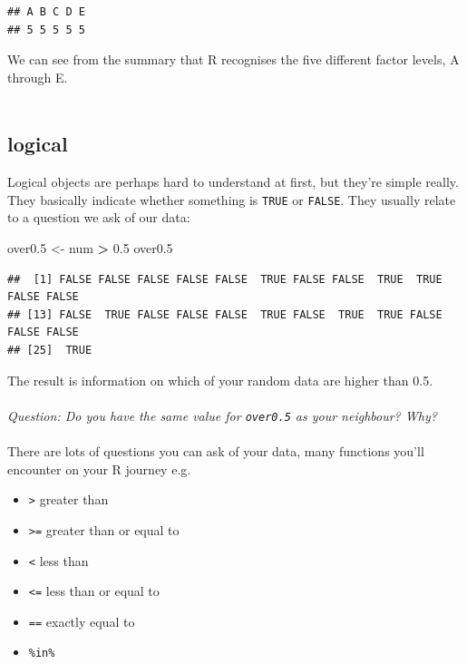 \documentclass[
]{book}
\newenvironment{Shaded}{\begin{snugshade}}{\end{snugshade}}
\newcommand{\FloatTok}[1]{\textcolor[rgb]{0.00,0.00,0.81}{#1}}
\newcommand{\NormalTok}[1]{#1}
\newcommand{\OperatorTok}[1]{\textcolor[rgb]{0.81,0.36,0.00}{\textbf{#1}}}
\newcommand{\StringTok}[1]{\textcolor[rgb]{0.31,0.60,0.02}{#1}}
\providecommand{\tightlist}{%
  \setlength{\itemsep}{0pt}\setlength{\parskip}{0pt}}
\begin{document}
\begin{verbatim}
## A B C D E 
## 5 5 5 5 5
\end{verbatim}

We can see from the summary that R recognises the five different factor levels,
A through E.\\
~\\

\hypertarget{logical}{%
\subsection{logical}\label{logical}}

Logical objects are perhaps hard to understand at first, but they're simple
really. They basically indicate whether something is \texttt{TRUE} or \texttt{FALSE}. They
usually relate to a question we ask of our data:

\begin{Shaded}
\begin{Highlighting}[]
\NormalTok{over0}\FloatTok{.5}\NormalTok{ <-}\StringTok{ }\NormalTok{num }\OperatorTok{>}\StringTok{ }\FloatTok{0.5}
\NormalTok{over0}\FloatTok{.5}
\end{Highlighting}
\end{Shaded}

\begin{verbatim}
##  [1] FALSE FALSE FALSE FALSE FALSE  TRUE FALSE FALSE  TRUE  TRUE FALSE FALSE
## [13] FALSE  TRUE FALSE FALSE FALSE  TRUE FALSE  TRUE  TRUE FALSE FALSE FALSE
## [25]  TRUE
\end{verbatim}

The result is information on which of your random data are higher than 0.5.\\
~\\

\emph{Question: Do you have the same value for \texttt{over0.5} as your neighbour? Why?}\\
~\\

There are lots of questions you can ask of your data, many functions you'll
encounter on your R journey e.g.~

\begin{itemize}
\tightlist
\item
  \texttt{\textgreater{}} greater than
\item
  \texttt{\textgreater{}=} greater than or equal to
\item
  \texttt{\textless{}} less than
\item
  \texttt{\textless{}=} less than or equal to
\item
  \texttt{==} exactly equal to
\item
  \texttt{\%in\%}~\\
\end{itemize}
\end{document}
